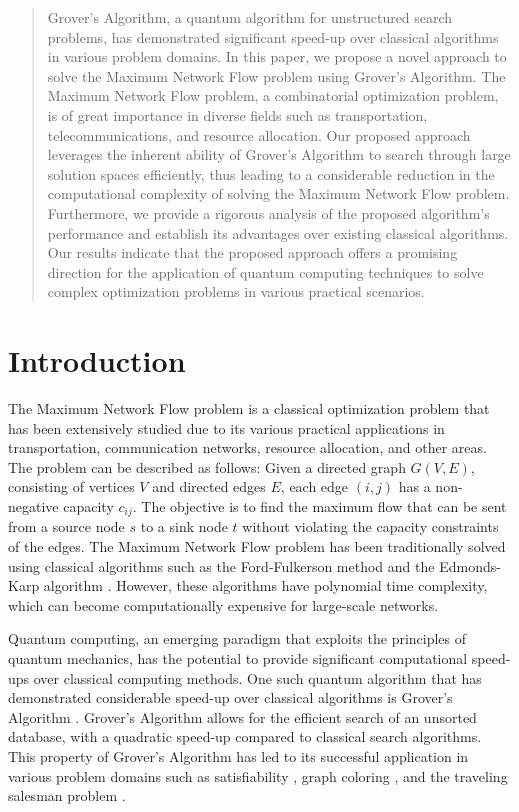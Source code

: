 \begin{abstract}
Grover's Algorithm, a quantum algorithm for unstructured search problems, has demonstrated significant speed-up over classical algorithms in various problem domains. In this paper, we propose a novel approach to solve the Maximum Network Flow problem using Grover's Algorithm. The Maximum Network Flow problem, a combinatorial optimization problem, is of great importance in diverse fields such as transportation, telecommunications, and resource allocation. Our proposed approach leverages the inherent ability of Grover's Algorithm to search through large solution spaces efficiently, thus leading to a considerable reduction in the computational complexity of solving the Maximum Network Flow problem. Furthermore, we provide a rigorous analysis of the proposed algorithm's performance and establish its advantages over existing classical algorithms. Our results indicate that the proposed approach offers a promising direction for the application of quantum computing techniques to solve complex optimization problems in various practical scenarios.

\end{abstract}

\section{Introduction}

The Maximum Network Flow problem is a classical optimization problem that has been extensively studied due to its various practical applications in transportation, communication networks, resource allocation, and other areas. The problem can be described as follows: Given a directed graph $G(V, E)$, consisting of vertices $V$ and directed edges $E$, each edge $(i, j)$ has a non-negative capacity $c_{ij}$. The objective is to find the maximum flow that can be sent from a source node $s$ to a sink node $t$ without violating the capacity constraints of the edges. The Maximum Network Flow problem has been traditionally solved using classical algorithms such as the Ford-Fulkerson method \cite{ford1956maximal} and the Edmonds-Karp algorithm \cite{edmonds1972theoretical}. However, these algorithms have polynomial time complexity, which can become computationally expensive for large-scale networks.

Quantum computing, an emerging paradigm that exploits the principles of quantum mechanics, has the potential to provide significant computational speed-ups over classical computing methods. One such quantum algorithm that has demonstrated considerable speed-up over classical algorithms is Grover's Algorithm \cite{grover1996fast}. Grover's Algorithm allows for the efficient search of an unsorted database, with a quadratic speed-up compared to classical search algorithms. This property of Grover's Algorithm has led to its successful application in various problem domains such as satisfiability \cite{garey2002computers}, graph coloring \cite{shor1999polynomial}, and the traveling salesman problem \cite{durr1996quantum}.


